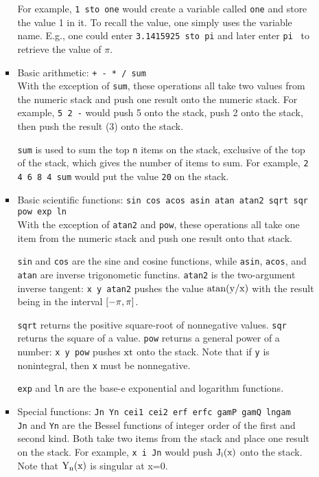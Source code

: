 \begin{itemize}
\begin{itemize}
\begin{itemize}
For example, {\tt 1 sto one} would create a variable called {\tt one} and store the value 1 in it.  To recall the
value, one simply uses the variable name.  E.g., one could enter {\tt 3.1415925 sto pi} and later enter
{\tt pi } to retrieve the value of $\pi$.

\item Basic arithmetic: {\tt + - * / sum}\\

With the exception of {\tt sum}, these operations all take two values
from the numeric stack and push one result onto the numeric stack.
For example, {\tt 5 2 -} would push 5 onto the stack, push 2 onto the
stack, then push the result (3) onto the stack.  

{\tt sum} is used to sum the top {\tt n} items on the stack, exclusive
of the top of the stack, which gives the number of items to sum.  For
example, {\tt 2 4 6 8 4 sum} would put the value {\tt 20} on the stack.

\item Basic scientific functions: {\tt sin cos acos asin atan atan2 sqrt sqr pow exp ln}\\

With the exception of {\tt atan2} and {\tt pow}, these operations all take one item from the numeric stack and push one
result onto that stack.

{\tt sin} and {\tt cos} are the sine and cosine functions, while {\tt asin}, {\tt acos}, and {\tt atan} are inverse
trigonometic functins.  {\tt atan2} is the two-argument inverse tangent: {\tt x y atan2} pushes the value ${\rm atan(y/x)}$
with the result being in the interval ${\rm [-\pi, \pi]}$.

{\tt sqrt} returns the positive square-root of nonnegative values.  {\tt sqr} returns the square of a value.  {\tt pow}
returns a general power of a number: {\tt x y pow} pushes ${\rm x t}$ onto the stack.  Note that if {\tt y} is
nonintegral, then {\tt x} must be nonnegative.

{\tt exp} and {\tt ln} are the base-e exponential and logarithm functions.

\item Special functions: {\tt Jn Yn cei1 cei2 erf erfc gamP gamQ lngam}\\
{\tt Jn} and {\tt Yn} are the Bessel functions of integer order of the first and second kind\cite{Abramowitz}.  Both take
two items from the stack and place one result on the stack.  For example, {\tt x i Jn} would push ${\rm J_i(x)}$ onto the
stack.  Note that ${\rm Y_n(x)}$ is singular at x=0.


\end{itemize}
\end{itemize}
\end{itemize}
